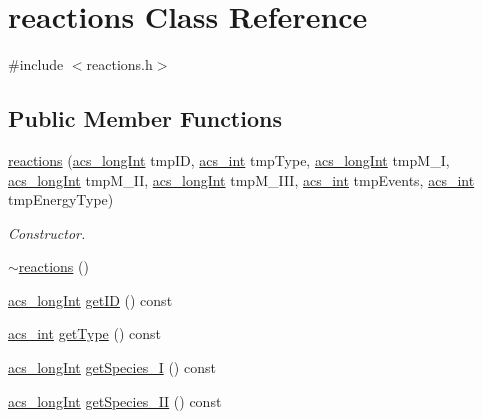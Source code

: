 \hypertarget{classreactions}{\section{reactions Class Reference}
\label{classreactions}
}


{\ttfamily \#include $<$reactions.\-h$>$}

\subsection*{Public Member Functions}
\begin{DoxyCompactItemize}
\item 
\hyperlink{classreactions_a496de9cbc128b98213ded20b936752c2}{reactions} (\hyperlink{acs__headers_8h_a19319d75f02db4308bc5c0026d98cd85}{acs\-\_\-long\-Int} tmp\-I\-D, \hyperlink{acs__headers_8h_a8d277355641a098190360234e2ebde35}{acs\-\_\-int} tmp\-Type, \hyperlink{acs__headers_8h_a19319d75f02db4308bc5c0026d98cd85}{acs\-\_\-long\-Int} tmp\-M\-\_\-\-I, \hyperlink{acs__headers_8h_a19319d75f02db4308bc5c0026d98cd85}{acs\-\_\-long\-Int} tmp\-M\-\_\-\-I\-I, \hyperlink{acs__headers_8h_a19319d75f02db4308bc5c0026d98cd85}{acs\-\_\-long\-Int} tmp\-M\-\_\-\-I\-I\-I, \hyperlink{acs__headers_8h_a8d277355641a098190360234e2ebde35}{acs\-\_\-int} tmp\-Events, \hyperlink{acs__headers_8h_a8d277355641a098190360234e2ebde35}{acs\-\_\-int} tmp\-Energy\-Type)
\begin{DoxyCompactList}\small\item\em Constructor. \end{DoxyCompactList}\item 
\hyperlink{classreactions_ad0c79e56e87891c502d8fcd6c4005987}{$\sim$reactions} ()
\item 
\hyperlink{acs__headers_8h_a19319d75f02db4308bc5c0026d98cd85}{acs\-\_\-long\-Int} \hyperlink{classreactions_a5c30ce559254e67f7d4e219a8fe26fcc}{get\-I\-D} () const 
\item 
\hyperlink{acs__headers_8h_a8d277355641a098190360234e2ebde35}{acs\-\_\-int} \hyperlink{classreactions_ad928f8c901ad8e318e201cedcf1209ba}{get\-Type} () const 
\item 
\hyperlink{acs__headers_8h_a19319d75f02db4308bc5c0026d98cd85}{acs\-\_\-long\-Int} \hyperlink{classreactions_a90adbdb8288b8c67c7715949848583ab}{get\-Species\-\_\-\-I} () const 
\item 
\hyperlink{acs__headers_8h_a19319d75f02db4308bc5c0026d98cd85}{acs\-\_\-long\-Int} \hyperlink{classreactions_ac0bdd6d9081645bf3a2c5531a71cbe40}{get\-Species\-\_\-\-I\-I} () const 

\end{DoxyCompactItemize}
